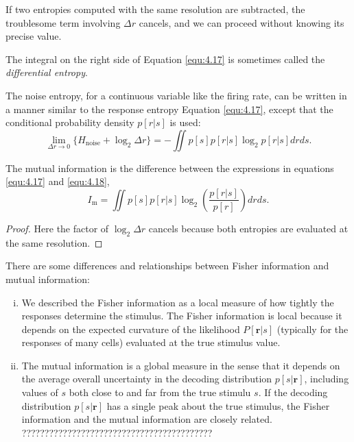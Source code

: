 \begin{rem}
  If two entropies computed with the same resolution are subtracted,
  the troublesome term involving $\Delta r$ cancels, and we can
  proceed without knowing its precise value.
\end{rem}

\begin{defn}
  The integral on the right side of Equation \ref{equ:4.17} is sometimes called the \emph{differential entropy}.
\end{defn}


\begin{prop}
  The noise entropy, for a continuous variable like the firing rate, can be written in a manner similar to the response entropy Equation \ref{equ:4.17}, except that the conditional probability density $p[r|s]$ is used:
\begin{equation}
  \label{equ:4.18}
  \lim\limits_{\Delta r\rightarrow 0}\{H_{\text{noise}}+\log_2\Delta
    r\}=-\iint{p[s]p[r|s]\log_2p[r|s]drds}.
\end{equation}
\end{prop}

\begin{prop}
  The mutual information is the difference between the expressions in equations
  \ref{equ:4.17}  and \ref{equ:4.18},
  \begin{equation}
    \label{equ:4.19}
    I_{\text{m}}=\iint{p[s]p[r|s]\log_{2}\left( \frac{p[r|s]}{p[r]} \right)drds}.
  \end{equation}
  \begin{proof}
    Here the factor of $\log_2\Delta r$ cancels  because both entropies are evaluated at the same resolution.
  \end{proof}
\end{prop}

\begin{rem}
  There are some differences and relationships%
  between Fisher information and mutual information:
  \begin{enumerate}[(i)]
  \item  We described the Fisher information as a local measure of
how tightly the responses determine the stimulus. The Fisher information is local because it depends on the expected curvature of the likelihood
$P[\mathbf{r}|s]$ (typically for the responses of many cells) evaluated
at the true stimulus value.
\item The mutual information is a global measure in the sense that
it depends on the average overall uncertainty in the decoding distribution
$p[s|\mathbf{r}]$, including values of $s$ both close to and far from
the true stimulu $s$.
If the decoding distribution $p[s|\mathbf{r}]$ has a single peak about the true stimulus, the Fisher information and the mutual information are closely
related.
??????????????????????????????????????????
\end{enumerate}
\end{rem}






